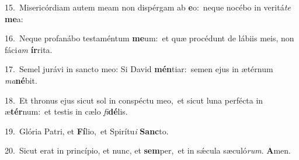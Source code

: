{\numbfont\textcolor{\numbcolor}{15.}}~Misericórdiam autem meam non dispérgam ab \textbf{e}\-o:~\star neque nocébo in veritá\textit{te} \textbf{me}\-a:\par
{\numbfont\textcolor{\numbcolor}{16.}}~Neque profanábo testaméntum \textbf{me}\-um:~\star et quæ procédunt de lábiis meis, non fáci\textit{am} \textbf{ír}\-rita.\par
{\numbfont\textcolor{\numbcolor}{17.}}~Semel jurávi in sancto meo: Si David \textbf{mén}\-tiar:~\star semen ejus in ætérnum \textit{ma}\-\textbf{né}bit.\par
{\numbfont\textcolor{\numbcolor}{18.}}~Et thronus ejus sicut sol in conspéctu meo,~\dagger et sicut luna perfécta in æ\-\textbf{tér}\-num:~\star et testis in cælo \textit{fi}\-\textbf{dé}lis.\par
{\numbfont\textcolor{\numbcolor}{19.}}~Glória Patri, et \textbf{Fí}\-lio,~\star et Spirítu\textit{i} \textbf{Sanc}\-to.\par
{\numbfont\textcolor{\numbcolor}{20.}}~Sicut erat in princípio, et nunc, et \textbf{sem}\-per,~\star et in sǽcula sæculó\-\textit{rum}\-. \textbf{A}\-men.\par
